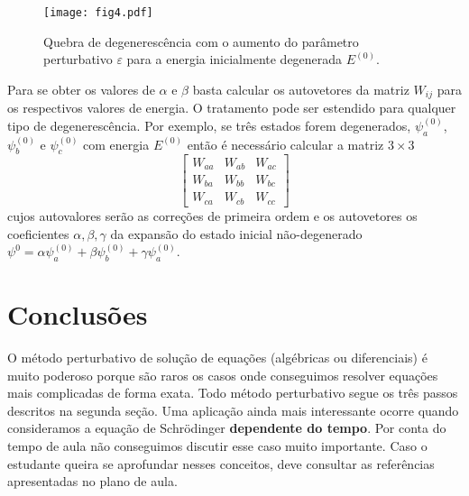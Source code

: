 \documentclass{article}
\begin{document}
\begin{figure}[ht]
\centering
\texttt{[image: fig4.pdf]}
\caption{Quebra de degenerescência com o aumento do parâmetro perturbativo $\varepsilon$ para a energia inicialmente degenerada $E^{(0)}$.}
\end{figure}

Para se obter os valores de $\alpha$ e $\beta$ basta calcular os autovetores da matriz $W_{ij}$ para os respectivos valores de energia. O tratamento pode ser estendido para qualquer tipo de degenerescência. Por exemplo, se três estados forem degenerados, $\psi_{a}^{(0)}$, $\psi_{b}^{(0)}$ e $\psi_{c}^{(0)}$ com energia $E^{(0)}$ então é necessário calcular a matriz $3\times 3$
\begin{equation}
    \begin{bmatrix}
    W_{aa} & W_{ab} & W_{ac} \\
    W_{ba} & W_{bb} & W_{bc} \\
    W_{ca} & W_{cb} & W_{cc}
    \end{bmatrix}
\end{equation}
cujos autovalores serão as correções de primeira ordem e os autovetores os coeficientes $\alpha,\beta,\gamma$ da expansão do estado inicial não-degenerado $\psi^{0} = \alpha \psi_{a}^{(0)} + \beta \psi_{b}^{(0)} + \gamma\psi_{a}^{(0)}$.

\section{Conclusões}

O método perturbativo de solução de equações (algébricas ou diferenciais) é muito poderoso porque são raros os casos onde conseguimos resolver equações mais complicadas de forma exata. Todo método perturbativo segue os três passos descritos na segunda seção. Uma aplicação ainda mais interessante ocorre quando consideramos a equação de Schrödinger \textbf{dependente do tempo}. Por conta do tempo de aula não conseguimos discutir esse caso muito importante. Caso o estudante queira se aprofundar nesses conceitos, deve consultar as referências apresentadas no plano de aula.
\end{document}
